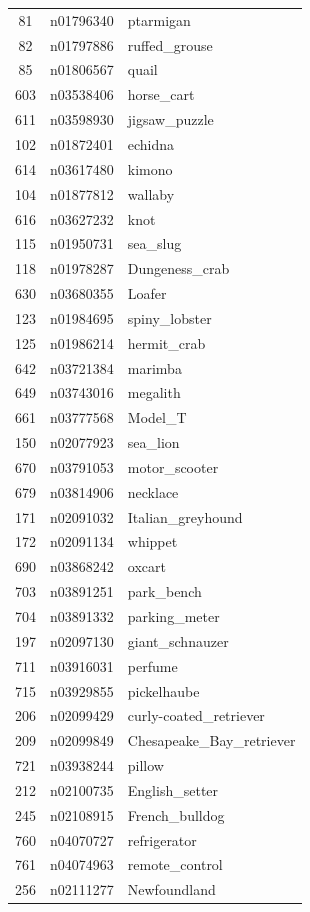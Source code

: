\begin{table}
\begin{tabular}{cll}
81 & n01796340 & ptarmigan \\
82 & n01797886 & ruffed_grouse \\
85 & n01806567 & quail \\
603 & n03538406 & horse_cart \\
611 & n03598930 & jigsaw_puzzle \\
102 & n01872401 & echidna \\
614 & n03617480 & kimono \\
104 & n01877812 & wallaby \\
616 & n03627232 & knot \\
115 & n01950731 & sea_slug \\
118 & n01978287 & Dungeness_crab \\
630 & n03680355 & Loafer \\
123 & n01984695 & spiny_lobster \\
125 & n01986214 & hermit_crab \\
642 & n03721384 & marimba \\
649 & n03743016 & megalith \\
661 & n03777568 & Model_T \\
150 & n02077923 & sea_lion \\
670 & n03791053 & motor_scooter \\
679 & n03814906 & necklace \\
171 & n02091032 & Italian_greyhound \\
172 & n02091134 & whippet \\
690 & n03868242 & oxcart \\
703 & n03891251 & park_bench \\
704 & n03891332 & parking_meter \\
197 & n02097130 & giant_schnauzer \\
711 & n03916031 & perfume \\
715 & n03929855 & pickelhaube \\
206 & n02099429 & curly-coated_retriever \\
209 & n02099849 & Chesapeake_Bay_retriever \\
721 & n03938244 & pillow \\
212 & n02100735 & English_setter \\
245 & n02108915 & French_bulldog \\
760 & n04070727 & refrigerator \\
761 & n04074963 & remote_control \\
256 & n02111277 & Newfoundland \\

\end{tabular}
\end{table}

